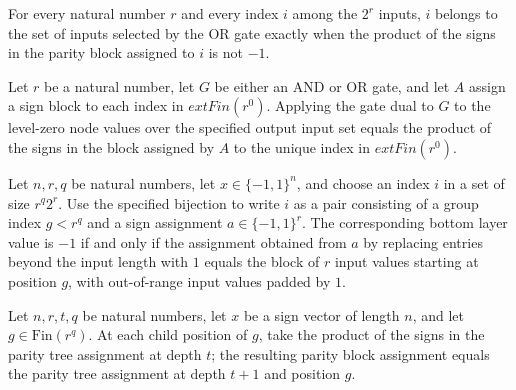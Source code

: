 \begin{theorem}
\label{FABL.mem_parityOutputInputs_or_iff}
\leanok
{}
For every natural number $r$ and every index $i$ among the $2^r$ inputs, $i$ belongs to
the set of inputs selected by the OR gate exactly when the product of the signs in the
parity block assigned to $i$ is not $-1$.
\end{theorem}

\begin{theorem}
\label{FABL.eval_parityOutputInputs}
\leanok
{}
Let $r$ be a natural number, let $G$ be either an AND or OR gate, and let $A$ assign a
sign block to each index in $	ext{Fin}(r^0)$. Applying the gate dual to $G$ to the
level-zero node values over the specified output input set equals the product of the
signs in the block assigned by $A$ to the unique index in $	ext{Fin}(r^0)$.
\end{theorem}

\begin{theorem}
\label{FABL.parityBottomLayerValues_eq_neg_one_iff}
\leanok
{}
Let $n,r,q$ be natural numbers, let $x\in\{-1,1\}^n$, and choose an index $i$ in a set
of size $r^q2^r$. Use the specified bijection to write $i$ as a pair consisting of a
group index $g<r^q$ and a sign assignment $a\in\{-1,1\}^r$. The corresponding bottom
layer value is $-1$ if and only if the assignment obtained from $a$ by replacing entries
beyond the input length with $1$ equals the block of $r$ input values starting at
position $g$, with out-of-range input values padded by $1$.
\end{theorem}

\begin{theorem}
\label{FABL.parityNextActualAssignment_tree}
\leanok
{}
Let $n,r,t,q$ be natural numbers, let $x$ be a sign vector of length $n$, and let
$g\in\text{Fin}(r^q)$. At each child position of $g$, take the product of the signs in
the parity tree assignment at depth $t$; the resulting parity block assignment equals
the parity tree assignment at depth $t+1$ and position $g$.
\end{theorem}

